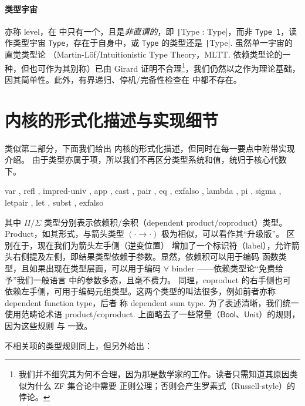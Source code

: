 \paragraph{类型宇宙} 亦称 level，在 \Tigrisd 中只有一个，且是\emph{非直谓的}，即 \texttt|Type : Type|，而非 \texttt{Type 1}，读作类型宇宙 \texttt{Type}，存在于自身中，或
\texttt{Type} 的类型还是 \texttt|Type|. 虽然单一宇宙的直觉类型论
（Martin-Löf/Intuitionistic Type Theory，MLTT. 依赖类型论的一种，但也可作为其别称）已由
Girard 证明不合理\footnote{
  我们并不细究其为何不合理，因为那是数学家的工作。读者只需知道其原因类似为什么 ZF 集合论中需要
  正则公理；否则会产生罗素式（Russell-style）的悖论。
}，我们仍然以之作为理论基础，因其简单性。此外，有界递归、停机/完备性检查在 \Tigrisd 中都不存在。

\section{\Tigrisd 内核的形式化描述与实现细节}
类似第二部分，下面我们给出 \Tigrisd 内核的形式化描述，但同时在每一要点中附带实现介绍。
由于类型亦属于项，所以我们不再区分类型系统和值，统归于核心代数下。
\allowdisplaybreaks


{ var
  , refl
  , impred-univ
  , app
  , cast
  , pair
  , eq
  , exfalso
  , lambda
  , pi
  , sigma
  , letpair
  , let
  , subst
, exfalso}

其中 $\Pi/\Sigma$ 类型分别表示依赖积/余积（dependent product/coproduct）类型。
Product，如其形式，与箭头类型 $(\cdot\to\cdot)$ 极为相似，可以看作其“升级版”。
区别在于，现在我们为箭头左手侧（逆变位置）
增加了一个标识符（label），允许箭头右侧提及左侧，即结果类型依赖于参数。显然，依赖积可以用于编码
函数类型，且如果出现在类型层面，可以用于编码 $\forall$ binder ——依赖类型论“免费给予”我们一般语言
中的参数多态，且毫不费力。
同理，coproduct 的右手侧也可
依赖左手侧，可用于编码元组类型。这两个类型的叫法很多，例如前者亦称 dependent function type，后者
称 dependent sum type. 为了表述清晰，我们统一使用范畴论术语 product/coproduct.
上面略去了一些常量（$\mathsf{Bool}$、$\mathsf{Unit}$）的规则，因为这些规则
与 \Tigris 一致。

不相关项的类型规则同上，但另外给出：


